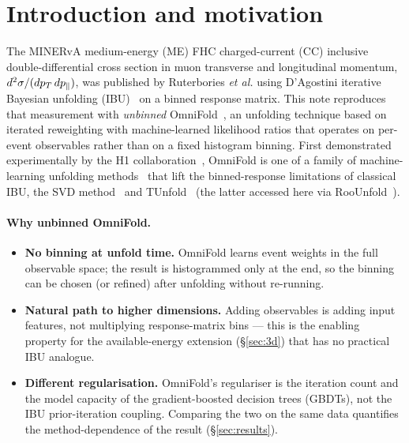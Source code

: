 \section{Introduction and motivation}
\label{sec:intro}

The MINERvA medium-energy (ME) FHC charged-current (CC) inclusive
double-differential cross section in muon transverse and longitudinal momentum,
$d^{2}\sigma/(dp_{T}\,dp_{\parallel})$, was published by Ruterbories \emph{et al.}
\cite{MINERvA:2021owq} using D'Agostini iterative Bayesian unfolding
(IBU)~\cite{DAgostini:1994fjx} on a binned response matrix. This note reproduces
that measurement with \emph{unbinned} OmniFold~\cite{Andreassen:2019cjw,
Andreassen:2021zzk}, an unfolding technique based on iterated reweighting with
machine-learned likelihood ratios that operates on per-event observables rather
than on a fixed histogram binning. First demonstrated experimentally by the H1
collaboration~\cite{H1:2021wkz,H1:2023fzk}, OmniFold is one of a family of
machine-learning unfolding methods~\cite{Datta:2018mwd,Bellagente:2019uyp,
Bellagente:2020piv,Backes:2022vmn,Chan:2023tbf} that lift the binned-response
limitations of classical IBU, the SVD method~\cite{Hocker:1995kb} and
TUnfold~\cite{Schmitt:2012kp} (the latter accessed here via
RooUnfold~\cite{Adye:2011gm}).

\paragraph{Why unbinned OmniFold.}
\begin{itemize}
  \item \textbf{No binning at unfold time.} OmniFold learns event weights in the
        full observable space; the result is histogrammed only at the end, so the
        binning can be chosen (or refined) after unfolding without re-running.
  \item \textbf{Natural path to higher dimensions.} Adding observables is adding
        input features, not multiplying response-matrix bins --- this is the
        enabling property for the available-energy extension
        (\S\ref{sec:3d}) that has no practical IBU analogue.
  \item \textbf{Different regularisation.} OmniFold's regulariser is the
        iteration count and the model capacity of the gradient-boosted decision
        trees (GBDTs), not the IBU prior-iteration coupling. Comparing the two
        on the same data quantifies the method-dependence of the result
        (\S\ref{sec:results}).
\end{itemize}

